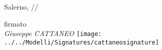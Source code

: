 \documentclass[11pt,a4paper,sans]{moderncv}        %
\makeatletter
\newcommand{\currentDate}{\svnfileday/\svnfilemonth/\svnfileyear}
\renewcommand*{\bibliographyitemlabel}{\@biblabel{\arabic{enumiv}}}
\renewcommand*{\bibliographyitemlabel}{[\arabic{enumiv}]}%
\makeatother
\begin{document}
\bigskip

Salerno, \currentDate

\hfill\parbox[t]{8cm}{
  \begin{center}
    firmato\\
    \textit{Giuseppe CATTANEO}
	 \texttt{[image: ../../Modelli/Signatures/cattaneosignature]}
  \end{center}
}

%
%
%
%
%
%
\end{document}
